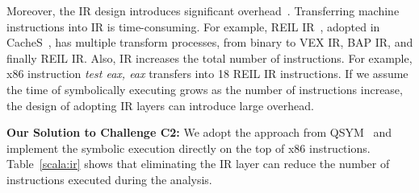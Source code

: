 Moreover, the IR design introduces significant overhead~\cite{217563}.
Transferring machine instructions into IR is time-consuming. For example,
REIL IR~\cite{dullien2009reil}, adopted in CacheS~\cite{236338}, has multiple
transform processes, from binary to VEX IR, BAP IR, and finally REIL IR\@. 
Also, IR increases the total number of instructions. For example, x86
instruction \textit{test eax, eax} transfers into 18 REIL IR instructions. If we
assume the time of symbolically executing grows as the number of instructions increase, the
design of adopting IR layers can introduce large overhead.

\vspace*{2pt}
\textbf{Our Solution to Challenge C2:}
We adopt the approach from QSYM~\cite{217563} and implement the symbolic execution
directly on the top of x86 instructions. Table~\ref{scala:ir} shows that
eliminating the IR layer can reduce the number of instructions executed during
the analysis.

\begin{table}%
      \centering\small\footnotesize
      \caption{The number of x86,  %
             REIL IR, and VEX IR instructions on the traces of crypto programs.}
      \label{scala:ir}
\vspace*{-1pt}
\end{table}

